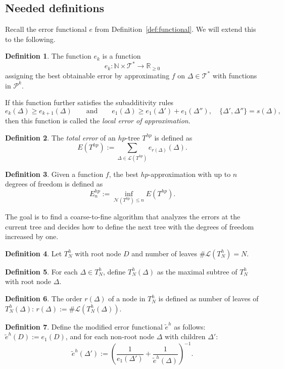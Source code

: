 \documentclass[11pt]{report}
\theoremstyle{definition}
\newtheorem{definition}{Definition}
\theoremstyle{remark}
\newcommand{\R}{\mathbb{R}}
\newcommand{\N}{\mathbb{N}}
\newcommand{\T}{\mathcal{T}}
\renewcommand{\L}{\mathcal{L}}
\newcommand{\cN}{\mathcal{N}}
\renewcommand{\P}{\mathcal{P}}
\newcommand{\hp}{{hp}}
\newcommand{\node}{\Delta}
\newcommand{\te}{\tilde e}
\begin{document}
\subsection{Needed definitions}
Recall the error functional $e$ from Definition~\ref{def:functional}. We will extend this to the following.
\begin{definition}
  The function $e_k$ is a function
  \[
    e_k: \N \times \T^* \to \R_{\geq 0}
  \]
  assigning the best obtainable error by approximating $f$ on $\node \in \T^*$ with functions in $\P^k$.

  If this function further satisfies the subadditivity rules 
  \[ 
    e_k(\node) \geq e_{k+1}(\node) \qquad \text{and} \qquad e_1(\node) \geq e_1(\node') + e_1(\node''), \quad \{\node', \node''\} = s(\node),
  \]
  then this function is called the \emph{local error of approximation}.
\end{definition}
\begin{definition}
  The \emph{total error} of an $hp$-tree $T^\hp$ is defined as
  \[
    E(T^\hp) := \sum_{\node \in \L(T^\hp)} e_{r(\node)}(\node).
  \]
\end{definition}
\begin{definition}
  Given a function $f$, the best $hp$-approximation with up to $n$ degrees of freedom is defined as
  \[
    E^\hp_n := \inf_{\cN(T^\hp) \leq n } E( T^\hp).
  \]
\end{definition}

The goal is to find a coarse-to-fine algorithm that analyzes the errors at the current tree and decides how to define the next tree with the degrees of freedom increased by one.

\begin{definition}

  Let $T^h_N$ with root node $D$ and number of leaves $\#\L(T^h_N) = N$.
\end{definition}
\begin{definition}
  For each $\node \in T^h_N$, define $T^h_N(\node)$ as the maximal subtree of $T^h_N$ with root node $\node$.
\end{definition}
\begin{definition}
  The order $r(\node)$ of a node in $T^h_N$ is defined as number of leaves of $T^h_N(\node)$: $r(\node) := \#\L(T^h_N(\node))$.
\end{definition}
\begin{definition}
  Define the modified error functional $\te^h$ as follows: $\te^h(D) := e_1(D)$, and for each non-root node $\node$ with children $\node'$:
  \[
    \te^h(\node') := \left( \frac{1}{e_1(\node')} + \frac{1}{\te^h(\node)} \right)^{-1}.
  \]
\end{definition}
\end{document}
